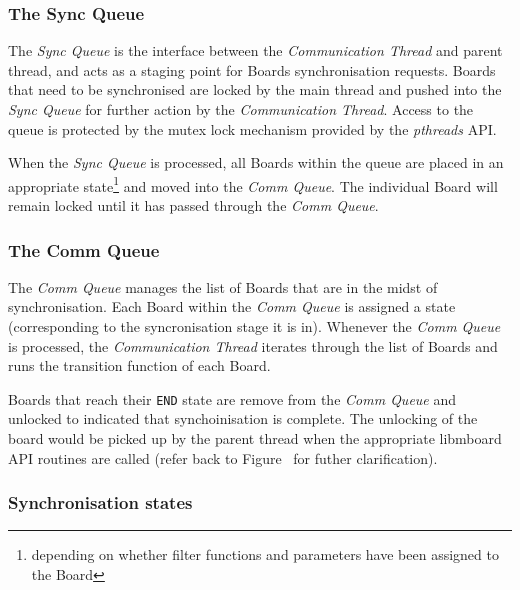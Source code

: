 \subsubsection{The Sync Queue}

The \textit{Sync Queue} is the interface between the \textit{Communication Thread} and parent thread, and acts as a staging point for Boards synchronisation requests. Boards that need to be synchronised are locked by the main thread and pushed into the \textit{Sync Queue} for further action by the \textit{Communication Thread}. Access to the queue is protected by the mutex lock mechanism provided by the \textit{pthreads} API.

When the \textit{Sync Queue} is processed, all Boards within the queue are placed in an appropriate state\footnote{depending on whether filter functions and parameters have been assigned to the Board} and moved into the \textit{Comm Queue}. The individual Board will remain locked until it has passed through the \textit{Comm Queue}.

\subsubsection{The Comm Queue}

The \textit{Comm Queue} manages the list of Boards that are in the midst of synchronisation. Each Board within the \textit{Comm Queue} is assigned a state (corresponding to the syncronisation stage it is in). Whenever the \textit{Comm Queue} is processed, the \textit{Communication Thread} iterates through the list of Boards and runs the transition function of each Board. 

Boards that reach their \texttt{END} state are remove from the \textit{Comm Queue} and unlocked to indicated that synchoinisation is complete. The unlocking of the board would be picked up by the parent thread when the appropriate libmboard API routines are called (refer back to Figure~\label{fig:syncboard} for futher clarification).

\subsubsection{Synchronisation states}

